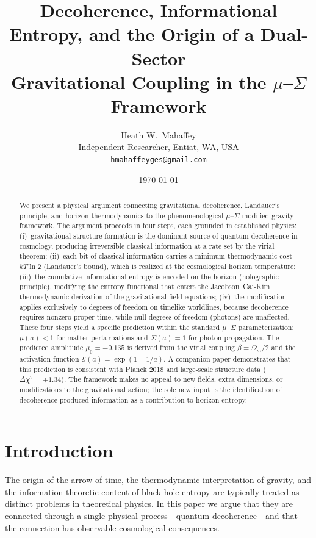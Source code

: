 \documentclass[11pt]{article}
\title{Decoherence, Informational Entropy, and the Origin of a Dual-Sector\\
Gravitational Coupling in the $\mu$--$\Sigma$ Framework}
\author{Heath W.\ Mahaffey\\
Independent Researcher, Entiat, WA, USA\\
\texttt{hmahaffeyges@gmail.com}}
\date{\today}
\begin{document}
\maketitle

\begin{abstract}
We present a physical argument connecting gravitational decoherence, Landauer's
principle, and horizon thermodynamics to the phenomenological $\mu$--$\Sigma$
modified gravity framework.  The argument proceeds in four steps, each grounded
in established physics:
(i)~gravitational structure formation is the dominant source of quantum
decoherence in cosmology, producing irreversible classical information at a rate
set by the virial theorem;
(ii)~each bit of classical information carries a minimum thermodynamic cost
$kT\ln 2$ (Landauer's bound), which is realized at the cosmological horizon
temperature;
(iii)~the cumulative informational entropy is encoded on the horizon
(holographic principle), modifying the entropy functional that enters the
Jacobson--Cai-Kim thermodynamic derivation of the gravitational field equations;
(iv)~the modification applies exclusively to degrees of freedom on timelike
worldlines, because decoherence requires nonzero proper time, while null degrees
of freedom (photons) are unaffected.
These four steps yield a specific prediction within the standard $\mu$--$\Sigma$
parameterization: $\mu(a) < 1$ for matter perturbations and $\Sigma(a) = 1$ for
photon propagation.  The predicted amplitude $\mu_0 = -0.135$ is derived from
the virial coupling $\beta = \Omega_m/2$ and the activation function
$\mathcal{E}(a) = \exp(1 - 1/a)$.  A companion paper demonstrates that this
prediction is consistent with Planck 2018 and large-scale structure data
($\Delta\chi^2 = +1.34$).  The framework makes no appeal to new fields, extra
dimensions, or modifications to the gravitational action; the sole new input is
the identification of decoherence-produced information as a contribution to
horizon entropy.
\end{abstract}


\section{Introduction}
\label{sec:intro}

The origin of the arrow of time, the thermodynamic interpretation of gravity,
and the information-theoretic content of black hole entropy are typically treated
as distinct problems in theoretical physics.  In this paper we argue that they
are connected through a single physical process---quantum decoherence---and that
the connection has observable cosmological consequences.
\end{document}
